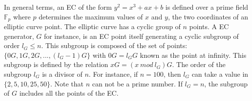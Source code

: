 In general terms, an EC of the form $y^2 = x^3 + ax + b$ is defined over a prime field $\mathbb{F}_p$ where $p$ determines the maximum values of $x$ and $y$, the two coordinates of an elliptic curve point. The elliptic curve has a cyclic group of $n$ points. A EC generator, $G$ for instance, is an EC point itself generating a cyclic subgroup of order $l_G \leq n$. This subgroup is composed of the set of points: $\{0G, 1G, 2G,...,(l_G-1)G\}$ with $0G = l_GG$ known as the point at infinity. This subgroup is defined by the relation $xG = (x ~mod~l_G)G$. The order of the subgroup $l_G$ is a divisor of $n$. For instance, if $n = 100$, then $l_G$ can take a value in $\{2, 5, 10, 25, 50\}$. Note that $n$ can not be a prime number. If $l_G = n$, the subgroup of $G$ includes all the points of the EC.\\
